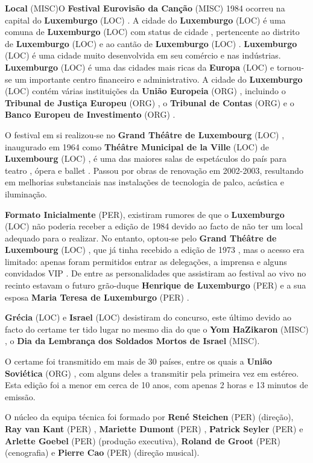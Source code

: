 \documentclass[12pt,a4paper]{article}
\begin{document}
\textbf{Local} (MISC)O \textbf{Festival Eurovisão da Canção} (MISC) 1984 ocorreu na capital do \textbf{Luxemburgo} (LOC) . A cidade do \textbf{Luxemburgo} (LOC) é uma comuna de \textbf{Luxemburgo} (LOC) com status de cidade , pertencente ao distrito de \textbf{Luxemburgo} (LOC) e ao cantão de \textbf{Luxemburgo} (LOC) . \textbf{Luxemburgo} (LOC) é uma cidade muito desenvolvida em seu comércio e nas indústrias. \textbf{Luxemburgo} (LOC) é uma das cidades mais ricas da \textbf{Europa} (LOC) e tornou-se um importante centro financeiro e administrativo. A cidade do \textbf{Luxemburgo} (LOC) contém várias instituições da \textbf{União Europeia} (ORG) , incluindo o \textbf{Tribunal de Justiça Europeu} (ORG) , o \textbf{Tribunal de Contas} (ORG) e o \textbf{Banco Europeu de Investimento} (ORG) .

O festival em si realizou-se no \textbf{Grand Théâtre de Luxembourg} (LOC) , inaugurado em 1964 como \textbf{Théâtre Municipal de la Ville} (LOC) de \textbf{Luxembourg} (LOC) , é uma das maiores salas de espetáculos do país para teatro , ópera e ballet . Passou por obras de renovação em 2002-2003, resultando em melhorias substanciais nas instalações de tecnologia de palco, acústica e iluminação.



\textbf{Formato Inicialmente} (PER), existiram rumores de que o \textbf{Luxemburgo} (LOC) não poderia receber a edição de 1984 devido ao facto de não ter um local adequado para o realizar. No entanto, optou-se pelo \textbf{Grand Théâtre de Luxembourg} (LOC) , que já tinha recebido a edição de 1973 , mas o acesso era limitado: apenas foram permitidos entrar as delegações, a imprensa e alguns convidados VIP . De entre as personalidades que assistiram ao festival ao vivo no recinto estavam o futuro grão-duque \textbf{Henrique de Luxemburgo} (PER) e a sua esposa \textbf{Maria Teresa de Luxemburgo} (PER) .

\textbf{Grécia} (LOC) e \textbf{Israel} (LOC) desistiram do concurso, este último devido ao facto do certame ter tido lugar no mesmo dia do que o \textbf{Yom HaZikaron} (MISC) , o \textbf{Dia da Lembrança dos Soldados Mortos de Israel} (MISC).

O certame foi transmitido em mais de 30 países, entre os quais a \textbf{União Soviética} (ORG) , com alguns deles a transmitir pela primeira vez em estéreo. Esta edição foi a menor em cerca de 10 anos, com apenas 2 horas e 13 minutos de emissão.

O núcleo da equipa técnica foi formado por \textbf{René Steichen} (PER) (direção), \textbf{Ray van Kant} (PER) , \textbf{Mariette Dumont} (PER) , \textbf{Patrick Seyler} (PER) e \textbf{Arlette Goebel} (PER) (produção executiva), \textbf{Roland de Groot} (PER) (cenografia) e \textbf{Pierre Cao} (PER) (direção musical).
\end{document}
